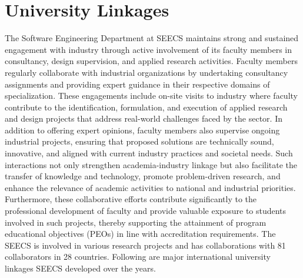 \section{University Linkages}

The Software Engineering Department at SEECS maintains strong and sustained engagement with industry through active involvement of its faculty members in consultancy, design supervision, and applied research activities. Faculty members regularly collaborate with industrial organizations by undertaking consultancy assignments and providing expert guidance in their respective domains of specialization. These engagements include on-site visits to industry where faculty contribute to the identification, formulation, and execution of applied research and design projects that address real-world challenges faced by the sector. In addition to offering expert opinions, faculty members also supervise ongoing industrial projects, ensuring that proposed solutions are technically sound, innovative, and aligned with current industry practices and societal needs. Such interactions not only strengthen academia-industry linkage but also facilitate the transfer of knowledge and technology, promote problem-driven research, and enhance the relevance of academic activities to national and industrial priorities. Furthermore, these collaborative efforts contribute significantly to the professional development of faculty and provide valuable exposure to students involved in such projects, thereby supporting the attainment of program educational objectives (PEOs) in line with accreditation requirements. The SEECS is involved in various research projects and has collaborations with 81 collaborators in 28 countries. Following are major international university linkages SEECS developed over the years.

